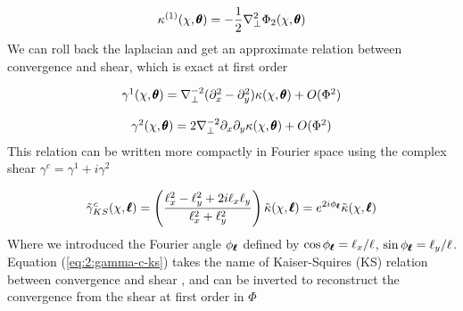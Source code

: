 \begin{equation}
\label{eq:2:kappa-1-lapl}
\kappa^{(1)}(\chi,\pmb{\theta}) = -\frac{1}{2}\nabla_\perp^2 \Phi_2(\chi,\pmb{\theta})
\end{equation}
%
We can roll back the laplacian and get an approximate relation between convergence and shear, which is exact at first order

\begin{equation}
\label{eq:2:gamma-1-lapl}
\begin{matrix}
\gamma^1(\chi,\pmb{\theta}) = \nabla_\perp^{-2} (\partial_x^2-\partial_y^2) \kappa(\chi,\pmb{\theta}) + O(\Phi^2) \\ \\
\gamma^2(\chi,\pmb{\theta}) = 2\nabla_\perp^{-2} \partial_x\partial_y \kappa(\chi,\pmb{\theta}) + O(\Phi^2)
\end{matrix}
\end{equation}
%
This relation can be written more compactly in Fourier space using the complex shear $\gamma^c=\gamma^1+i\gamma^2$  

\begin{equation}
\label{eq:2:gamma-c-ks}
\tilde{\gamma}^c_{KS}(\chi,\pmb{\ell}) = \left(\frac{\ell_x^2-\ell_y^2+2i\ell_x\ell_y}{\ell_x^2+\ell_y^2}\right) \tilde{\kappa}(\chi,\pmb{\ell}) = e^{2i\phi_{\pmb{\ell}}} \tilde{\kappa}(\chi,\pmb{\ell})
\end{equation}
%
Where we introduced the Fourier angle $\phi_{\pmb{\ell}}$ defined by $\cos \phi_{\pmb{\ell}} = \ell_x/\ell$, $\sin\phi_{\pmb{\ell}}=\ell_y/\ell$. Equation (\ref{eq:2:gamma-c-ks}) takes the name of Kaiser-Squires (KS) relation between convergence and shear \citep{KaiserSquires}, and can be inverted to reconstruct the convergence from the shear at first order in $\Phi$

